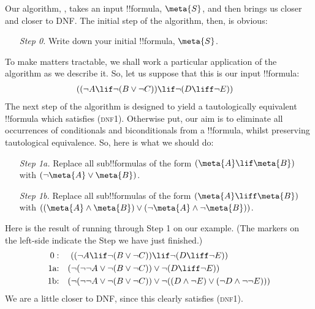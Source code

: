 \documentclass[../../../include/open-logic-section]{subfiles}
\begin{document}
Our algorithm, \intoDNF{}, takes an input !!{formula}, $\meta{S}$, and then brings us closer and closer to DNF. The initial step of the algorithm, then, is obvious:
	\begin{itemize}
		\item[\emph{Step 0.}] Write down your initial !!{formula}, $\meta{S}$.
	\end{itemize}
To make matters tractable, we shall work a particular application of the algorithm as we describe it. So, let us suppose that this is our input !!{formula}:
	\begin{align*}
	 ((\lnot A \lif \lnot (B \lor \lnot C)) &\lif \lnot (D \liff \lnot E))
	\end{align*}
The next step of the algorithm is designed to yield a tautologically equivalent !!{formula} which satisfies (\textsc{dnf1}). Otherwise put, our aim is to eliminate all occurrences of conditionals and biconditionals from a !!{formula}, whilst preserving tautological equivalence. So, here is what we should do:
	\begin{itemize}
		\item[\emph{Step 1a.}] Replace all sub!!{formula}s of the form $(\meta{A} \lif \meta{B})$ with $(\lnot\meta{A} \lor \meta{B})$. 
		\item[\emph{Step 1b.}] Replace all sub!!{formula}s of the form  $(\meta{A} \liff \meta{B})$ with $((\meta{A} \land \meta{B}) \lor (\lnot \meta{A} \land \lnot\meta{B}))$. 
	\end{itemize}
Here is the result of running through Step 1 on our example. (The markers on the left-side indicate the Step we have just finished.)
{\small	\begin{align*}
	 0: & & ((\lnot A \lif \lnot (B \lor \lnot  C)) &\lif \lnot (D \liff \lnot E))\\
	 \text{1a:} & & (\lnot (\lnot \lnot A \lor \lnot (B \lor \lnot  C)) &\lor \lnot (D \liff \lnot E)) \\
	 \text{1b:} & & (\lnot (\lnot \lnot A \lor \lnot (B \lor \lnot  C)) &\lor \lnot ((D \land \lnot E) \lor (\lnot D \land \lnot \lnot E)))
	\end{align*}}
We are a little closer to DNF, since this clearly satisfies (\textsc{dnf1}). 
\end{document}
